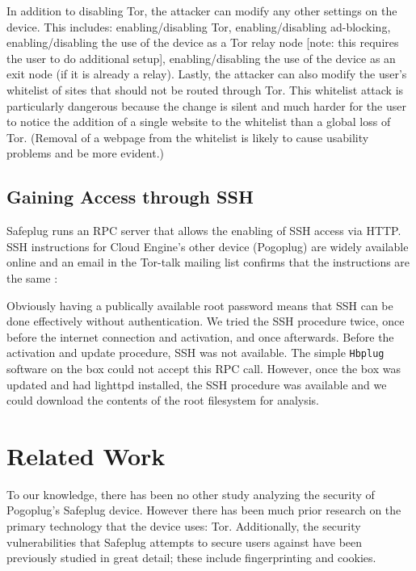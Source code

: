 \documentclass[conference]{IEEEtran}
\begin{document}
In addition to disabling Tor, the attacker can modify any other settings on the device.  This includes: enabling/disabling Tor, enabling/disabling ad-blocking, enabling/disabling the use of the device as a Tor relay node [note: this requires the user to do additional setup], enabling/disabling the use of the device as an exit node (if it is already a relay).  Lastly, the attacker can also modify the user's whitelist of sites that should not be routed through Tor.  This whitelist attack is particularly dangerous because the change is silent and much harder for the user to notice the addition of a single website to the whitelist than a global loss of Tor.  (Removal of a webpage from the whitelist is likely to cause usability problems and be more evident.)

\subsection{Gaining Access through SSH}
\label{sec:SSH}
    Safeplug runs an RPC server that allows the enabling of SSH access via HTTP. SSH instructions for Cloud Engine's other device (Pogoplug) are widely available online and an email in the Tor-talk mailing list confirms that the instructions are the same \cite{ceadmin}:

Obviously having a publically available root password means that SSH can be done effectively without authentication.  We tried the SSH procedure twice, once before the internet connection and activation, and once afterwards.  Before the activation and update procedure, SSH was not available.  The simple \verb!Hbplug! software on the box could not accept this RPC call.  However, once the box was updated and had lighttpd installed, the SSH procedure was available and we could download the contents of the root filesystem for analysis.

\section{Related Work}
To our knowledge, there has been no other study analyzing the security of Pogoplug's Safeplug device.  However there has been much prior research on the primary technology that the device uses: Tor.  Additionally, the security vulnerabilities that Safeplug attempts to secure users against have been previously studied in great detail; these include fingerprinting and cookies.  
\end{document}
